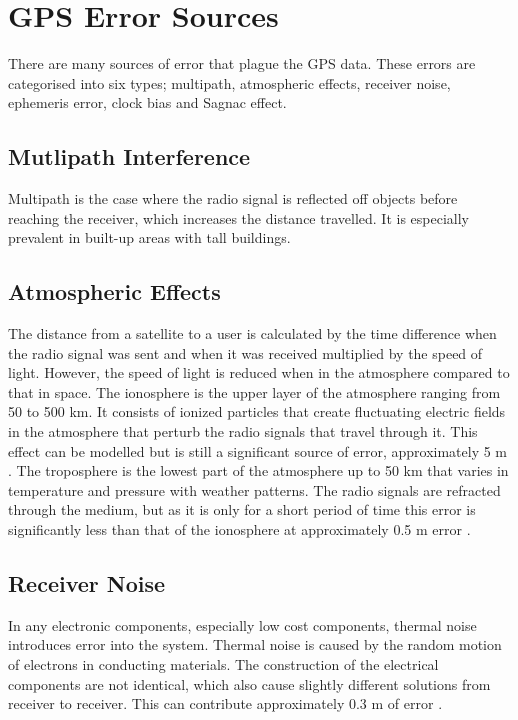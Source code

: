 
\section{GPS Error Sources} \label{sec:error sources}
There are many sources of error that plague the GPS data. These errors are categorised into six types; multipath, atmospheric effects, receiver noise, ephemeris error, clock bias and Sagnac effect.

\subsection{Mutlipath Interference}
Multipath is the case where the radio signal is reflected off objects before reaching the receiver, which increases the distance travelled. It is especially prevalent in built-up areas with tall buildings. 

\subsection{Atmospheric Effects}
The distance from a satellite to a user is calculated by the time difference when the radio signal was sent and when it was received multiplied by the speed of light. However, the speed of light is reduced when in the atmosphere compared to that in space.
The ionosphere is the upper layer of the atmosphere ranging from 50 to 500 km. It consists of ionized particles that create fluctuating electric fields in the atmosphere that perturb the radio signals that travel through it. This effect can be modelled but is still a significant source of error, approximately 5 m \cite{trimble_errors}. The troposphere is the lowest part of the atmosphere up to 50 km that varies in temperature and pressure with weather patterns. The radio signals are refracted through the medium, but as it is only for a short period of time this error is significantly less than that of the ionosphere at approximately 0.5 m error \cite{trimble_errors}.

\subsection{Receiver Noise}
In any electronic components, especially low cost components, thermal noise introduces error into the system. Thermal noise is caused by the random motion of electrons in conducting materials. The construction of the electrical components are not identical, which also cause slightly different solutions from receiver to receiver. This can contribute approximately 0.3 m of error \cite{trimble_errors}.

